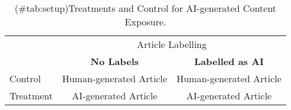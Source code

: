 \begin{table}
\centering
\caption{(\#tab:setup)Treatments and Control for AI-generated Content Exposure.}
\centering
\begin{tabular}[t]{lcc}
\toprule
\multicolumn{1}{c}{ } & \multicolumn{2}{c}{Article Labelling} \\
\cmidrule(l{3pt}r{3pt}){2-3}
\textbf{ } & \textbf{No Labels} & \textbf{Labelled as AI}\\
\midrule
Control & Human-generated Article & Human-generated Article\\
Treatment & AI-generated Article & AI-generated Article\\
\bottomrule
\end{tabular}
\end{table}